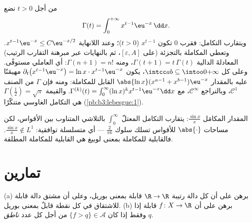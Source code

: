 \begin{example}\label{ex:b3:lebesgue:gamma}
من أجل $t > 0$ نضع
\[
\Gamma(t) = \int_0^{+\infty} x^{t-1}\eu^{-x}\,\dd x .
\]
ويتقارب التكامل: فقرب $0$ تكون $x^{t-1}$ 
($t >
0$)؛ وعند اللانهاية $x^{t-1}\eu^{-x} \leq C\eu^{-x/2}$. وتعطي المكاملة بالتجزئة (على
$[\varepsilon, A]$، ثم بالنهايات عبر مبرهنة التقارب الرتيب) المعادلةَ
الدالية $\Gamma(t + 1) =
t\,\Gamma(t)$، ومنه $\Gamma(n+1) = n!$: أي العاملي مستوفًى. وعلى كل
$\intcc ab \subseteq \intoo0{+\infty}$، يكون $\partial_t\bigl(x^{t-1}\eu^{-x}\bigr) = \ln
x\cdot x^{t-1}\eu^{-x}$ مهيمَنًا عليه بالمقدار $\abs{\ln x}(x^{a-1} +
x^{b-1})\eu^{-x}$ القابل للمكاملة:
ومنه فإن $\Gamma$ من الصنف $\mathcal C^1$، وبالتراجع $\mathcal C^\infty$، مع
$\Gamma^{(k)}(t) =
\int_0^\infty(\ln x)^kx^{t-1}\eu^{-x}\dd x$. والقيمة $\Gamma(\frac12) = \sqrt\pi$ هي التكامل الغاوسي متنكّرًا
(\cref{pb:b3:lebesgue:1}).
\end{example}

\begin{omfigure}

{\small المقدار المكامَل $\frac{\sin x}x$: يتقارب التكامل
المعتلّ $\int_0^\infty$ بالتلاشي المتناوب بين الأقواس، لكن
مساحات $\abs{\cdot}$ للأقواس تسلك سلوك $\frac2{\pi k}$ --- أي
متسلسلة توافقية: $\frac{\sin x}x
\notin L^1$. فالقابلية للمكاملة بمعنى لوبيغ هي
القابلية للمكاملة المطلقة.}
\end{omfigure}

\section{تمارين}

\begin{exercise}[$\star$]\label{exo:b3:lebesgue:1}
(a) برهن على أن كل دالة رتيبة $\R \to \R$ قابلة  بمعنى
بوريل، وعلى أن مشتق دالة قابلة للاشتقاق في كل نقطة قابلٌ 
بمعنى بوريل.
(b) برهن على أن $f \colon X \to \R$ قابلة  إذا وفقط إذا كان $\{f > q\}
\in \mathcal A$ من
أجل كل عدد \emph{ناطق} $q$.
\end{exercise}

